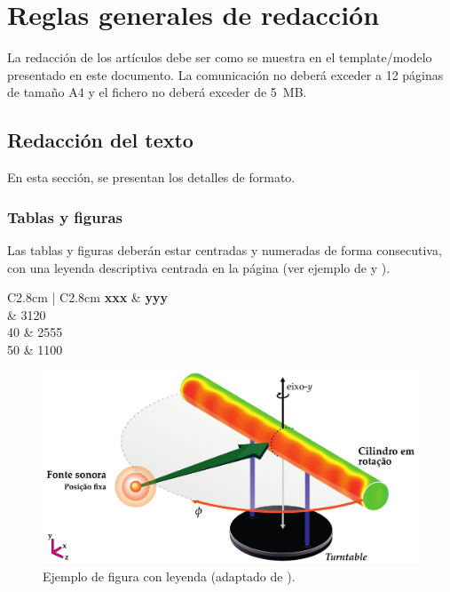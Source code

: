 \documentclass[11pt, a4paper, twoside]{article}
\begin{document}
\section{Reglas generales de redacción}

La redacción de los artículos debe ser como se muestra en el template/modelo presentado en este documento. La comunicación no deberá exceder a 12 páginas de tamaño A4 y el fichero no deberá exceder de 5~MB.


\subsection{Redacción del texto}

En esta sección, se presentan los detalles de formato.


\subsubsection{Tablas y figuras}

Las tablas y figuras deberán estar centradas y numeradas de forma consecutiva, con una leyenda descriptiva centrada en la página (ver ejemplo de  y ).


\begin{table}[H]
  \centering 
  \caption{Ejemplo de tabla xxx / yyy.}
	\fontsize{11}{12}\selectfont 
    \begin{tabular}{C{2.8cm} | C{2.8cm}}
    \toprule
    \textbf{ xxx } & \textbf{yyy} \\
	   & 3120\\
		 40	& 2555\\
		50 & 1100\\
    \bottomrule
    \end{tabular}
    \label{tab.exemplo}%
\end{table}%


\begin{figure}[H]
	\centering
	\includegraphics[width=0.75\linewidth]{Figuras/Measurement-Scheme-Fonseca-2013.pdf}%
	\caption{Ejemplo de figura con leyenda (adaptado de \cite{Fonseca-2013}).}%
	\label{fig:beamforming}%
\end{figure}
\end{document}
